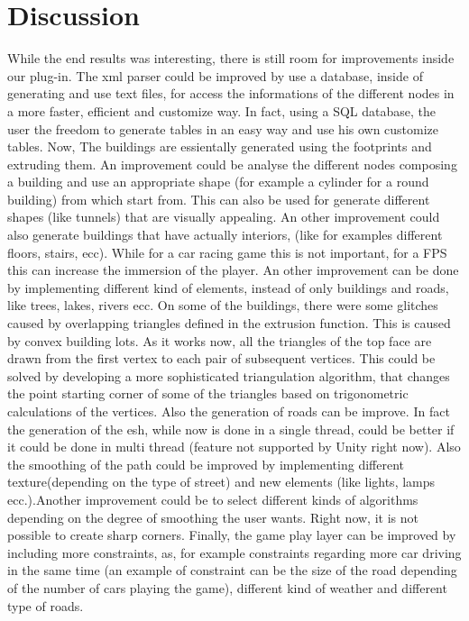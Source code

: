 \documentclass[conference]{IEEEtran}
\begin{document}
\section{Discussion}

While the end results was interesting, there is still room for improvements inside our plug-in.\newline
The xml parser could be improved by use a database, inside of generating and use text files, for access the informations of the different nodes in a more faster, efficient and customize way. In fact, using a SQL database, the user the freedom to generate tables in an easy way and use his own customize tables.\newline
Now, The buildings are essientally generated using the footprints and extruding them. An improvement could be analyse the different nodes composing a building and use an appropriate shape (for example a cylinder for a round building) from which start from. This can also be used for generate different shapes (like tunnels) that are visually appealing.  An other improvement could also generate buildings that have actually interiors, (like for examples different floors, stairs, ecc). While for a car racing game this is not important, for a FPS this can increase the immersion of the player. An other improvement can be done by implementing different kind of elements, instead of only buildings and roads, like trees, lakes, rivers ecc. On some of the buildings, there were some glitches caused by overlapping triangles defined in the extrusion function. This is caused by convex building lots. As it works now, all the triangles of the top face are drawn from the first vertex to each pair of subsequent vertices. This could be solved by developing a more sophisticated triangulation algorithm, that changes the point starting corner of some of the triangles based on trigonometric calculations of the vertices. 
\newline
\newline
Also the generation of roads can be improve. In fact the generation of the esh, while now is done in a single thread, could be better if it could be done in multi thread (feature not supported by Unity right now). Also the smoothing of the path could be improved by implementing different texture(depending on the type of street) and new elements (like lights, lamps ecc.).Another improvement could be to select different kinds of algorithms depending on the degree of smoothing the user wants. Right now, it is not possible to create sharp corners.
\newline
Finally, the game play layer can be improved by including more constraints, as, for example constraints regarding more car driving in the same time (an example of constraint can be the size of the road depending of the number of cars playing the game), different kind of weather and different type of roads.
\end{document}
